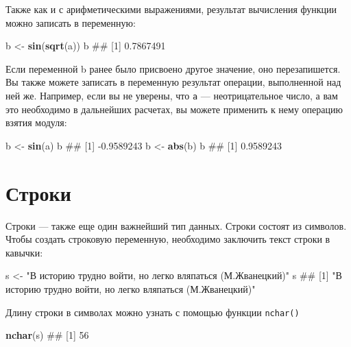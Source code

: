 \documentclass[]{book}
\newenvironment{Shaded}{\begin{snugshade}}{\end{snugshade}}
\newcommand{\KeywordTok}[1]{\textcolor[rgb]{0.13,0.29,0.53}{\textbf{#1}}}
\newcommand{\StringTok}[1]{\textcolor[rgb]{0.31,0.60,0.02}{#1}}
\newcommand{\NormalTok}[1]{#1}
\begin{document}
Также как и с арифметическими выражениями, результат вычисления функции
можно записать в переменную:

\begin{Shaded}
\begin{Highlighting}[]
\NormalTok{b <-}\StringTok{ }\KeywordTok{sin}\NormalTok{(}\KeywordTok{sqrt}\NormalTok{(a))}
\NormalTok{b}
\NormalTok{## [1] 0.7867491}
\end{Highlighting}
\end{Shaded}

Если переменной b ранее было присвоено другое значение, оно
перезапишется. Вы также можете записать в переменную результат операции,
выполненной над ней же. Например, если вы не уверены, что \texttt{a} ---
неотрицательное число, а вам это необходимо в дальнейших расчетах, вы
можете применить к нему операцию взятия модуля:

\begin{Shaded}
\begin{Highlighting}[]
\NormalTok{b <-}\StringTok{ }\KeywordTok{sin}\NormalTok{(a)}
\NormalTok{b}
\NormalTok{## [1] -0.9589243}
\NormalTok{b <-}\StringTok{ }\KeywordTok{abs}\NormalTok{(b)}
\NormalTok{b}
\NormalTok{## [1] 0.9589243}
\end{Highlighting}
\end{Shaded}

\section{Строки}\label{strings}

Строки --- также еще один важнейший тип данных. Строки состоят из
символов. Чтобы создать строковую переменную, необходимо заключить текст
строки в кавычки:

\begin{Shaded}
\begin{Highlighting}[]
\NormalTok{s <-}\StringTok{ "В историю трудно войти, но легко вляпаться (М.Жванецкий)"}
\NormalTok{s}
\NormalTok{## [1] "В историю трудно войти, но легко вляпаться (М.Жванецкий)"}
\end{Highlighting}
\end{Shaded}

Длину строки в символах можно узнать с помощью функции \texttt{nchar()}

\begin{Shaded}
\begin{Highlighting}[]
\KeywordTok{nchar}\NormalTok{(s)}
\NormalTok{## [1] 56}
\end{Highlighting}
\end{Shaded}
\end{document}
